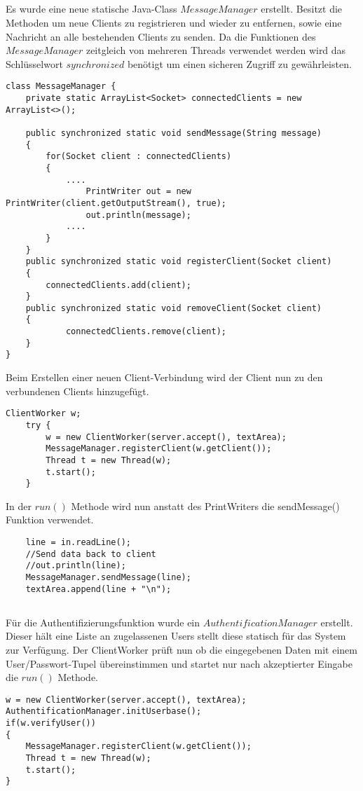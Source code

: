\documentclass[12pt]{article}
\theoremstyle{plain}
\begin{document}
\subsection{}
Es wurde eine neue statische Java-Class $MessageManager$ erstellt.
Besitzt die Methoden um neue Clients zu registrieren und wieder zu entfernen, sowie eine Nachricht an alle bestehenden Clients zu senden.
Da die Funktionen des $MessageManager$ zeitgleich von mehreren Threads verwendet werden wird das Schlüsselwort $synchronized$ benötigt um einen sicheren Zugriff zu gewährleisten.
\begin{lstlisting}
class MessageManager {
	private static ArrayList<Socket> connectedClients = new ArrayList<>();

	public synchronized static void sendMessage(String message)
	{
		for(Socket client : connectedClients)
		{
			....			
				PrintWriter out = new PrintWriter(client.getOutputStream(), true);
				out.println(message);
			....
		}
	}
	public synchronized static void registerClient(Socket client)
	{
		connectedClients.add(client);
	}
	public synchronized static void removeClient(Socket client)
	{
			connectedClients.remove(client);
	}
}
\end{lstlisting}
Beim Erstellen einer neuen Client-Verbindung wird der Client nun zu den verbundenen Clients hinzugefügt.
\begin{lstlisting}
ClientWorker w;
	try {
		w = new ClientWorker(server.accept(), textArea);
		MessageManager.registerClient(w.getClient());
		Thread t = new Thread(w);
		t.start();
	}
\end{lstlisting}
In der $run()$ Methode wird nun anstatt des PrintWriters die sendMessage() Funktion verwendet.
\begin{lstlisting}
	line = in.readLine();
	//Send data back to client
	//out.println(line);
	MessageManager.sendMessage(line);
	textArea.append(line + "\n");
\end{lstlisting}
\subsection{}
Für die Authentifizierungsfunktion wurde ein $AuthentificationManager$ erstellt.
Dieser hält eine Liste an zugelassenen Users stellt diese statisch für das System zur Verfügung.
Der ClientWorker prüft nun ob die eingegebenen Daten mit einem User/Passwort-Tupel übereinstimmen und startet nur nach akzeptierter Eingabe die $run()$ Methode.
\begin{lstlisting}
w = new ClientWorker(server.accept(), textArea);
AuthentificationManager.initUserbase();
if(w.verifyUser())
{
	MessageManager.registerClient(w.getClient());
	Thread t = new Thread(w);
	t.start();
}
\end{lstlisting}
\end{document}
